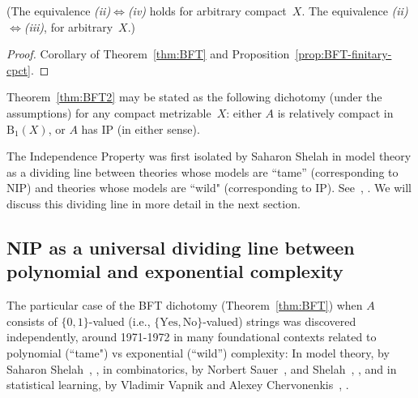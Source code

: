 (The equivalence \emph{(ii)}$\Leftrightarrow$\emph{(iv)} holds for arbitrary compact~$X$.
The equivalence \emph{(ii)}$\Leftrightarrow$\emph{(iii)}, for arbitrary~$X$.)

\begin{proof}
    Corollary of Theorem~\ref{thm:BFT} and Proposition~\ref{prop:BFT-finitary-cpct}.
\end{proof}

Theorem~\ref{thm:BFT2} may be stated as the following dichotomy (under the assumptions) for any compact metrizable~$X$:
either $A$ is relatively compact in~$\mathrm{B}_1(X)$, or $A$ has IP (in either sense).

The Independence Property was first isolated by Saharon Shelah in model theory as a dividing line between theories whose models are ``tame'' (corresponding to NIP) and theories whose models are ``wild" (corresponding to IP).
See~\cite[Definition 4.1]{Shelah:1971}, \cite{Shelah:1990}.
We will discuss this dividing line in more detail in the next section.

\subsection{NIP as a universal dividing line between polynomial and exponential complexity}

The particular case of the BFT dichotomy (Theorem~\ref{thm:BFT}) when $A$ consists of $\{0,1\}$-valued (i.e., $\{\text{Yes},\text{No}\}$-valued) strings was discovered independently, around 1971-1972 in many foundational contexts related to polynomial (``tame") vs exponential (``wild'') complexity: In model theory, by Saharon Shelah~\cite{Shelah:1971}, \cite{Shelah:1990}, in combinatorics, by Norbert Sauer~\cite{Sauer:1972}, and Shelah~\cite{Shelah:1972}, \cite{Shelah:1990}, and in statistical learning, by Vladimir Vapnik and Alexey Chervonenkis~\cite{Vapnik-Chervonenkis:1971}, \cite{Vapnik-Chervonenkis:1974}.


